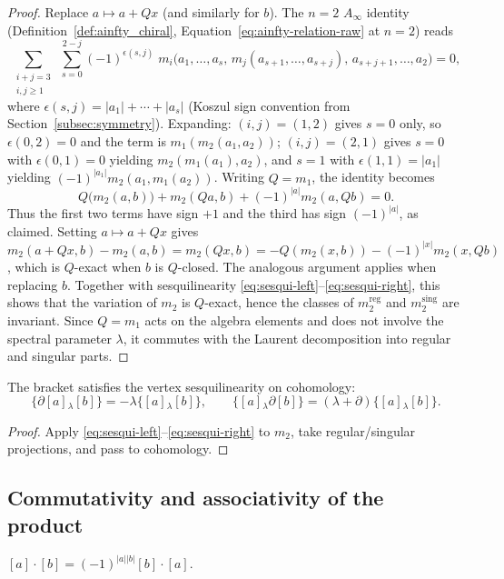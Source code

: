 \begin{proof}
Replace $a\mapsto a+Qx$ (and similarly for $b$). The $n=2$ $A_\infty$ identity (Definition~\ref{def:ainfty_chiral}, Equation~\eqref{eq:ainfty-relation-raw} at $n=2$) reads
\[
 \sum_{\substack{i+j=3 \\ i,j\ge 1}}\;\sum_{s=0}^{2-j}
 (-1)^{\epsilon(s,j)}\;
 m_i\bigl(a_1,\dots,a_s,\,m_j(a_{s+1},\dots,a_{s+j}),\,a_{s+j+1},\dots,a_2\bigr) = 0,
\]
where $\epsilon(s,j) = |a_1|+\cdots+|a_s|$ (Koszul sign convention from Section~\ref{subsec:symmetry}).
Expanding: $(i,j)=(1,2)$ gives $s=0$ only, so $\epsilon(0,2)=0$ and the term is $m_1(m_2(a_1,a_2))$; $(i,j)=(2,1)$ gives $s=0$ with $\epsilon(0,1)=0$ yielding $m_2(m_1(a_1),a_2)$, and $s=1$ with $\epsilon(1,1)=|a_1|$ yielding $(-1)^{|a_1|}m_2(a_1,m_1(a_2))$. Writing $Q=m_1$, the identity becomes
\[
 Q\bigl(m_2(a,b)\bigr) + m_2(Qa,b) + (-1)^{|a|}m_2(a,Qb) = 0.
\]
Thus the first two terms have sign $+1$ and the third has sign $(-1)^{|a|}$, as claimed. Setting $a\mapsto a+Qx$ gives $m_2(a+Qx,b) - m_2(a,b) = m_2(Qx,b) = -Q(m_2(x,b)) - (-1)^{|x|}m_2(x,Qb)$, which is $Q$-exact when $b$ is $Q$-closed. The analogous argument applies when replacing $b$. Together with sesquilinearity \eqref{eq:sesqui-left}--\eqref{eq:sesqui-right}, this shows that the variation of $m_2$ is $Q$-exact, hence the classes of $m_2^{\mathrm{reg}}$ and $m_2^{\mathrm{sing}}$ are invariant. Since $Q = m_1$ acts on the algebra elements and does not involve the spectral parameter $\lambda$, it commutes with the Laurent decomposition into regular and singular parts.
\end{proof}

\begin{proposition}[Sesquilinearity on $H$]
\label{prop:sesqui-H}
The bracket satisfies the vertex sesquilinearity on cohomology:
\[
\{\partial[a]{}_\lambda [b]\} = -\lambda \{[a]{}_\lambda [b]\},\qquad
\{[a]{}_\lambda \partial[b]\} = (\lambda+\partial)\{[a]{}_\lambda [b]\}.
\]
\end{proposition}

\begin{proof}
Apply \eqref{eq:sesqui-left}–\eqref{eq:sesqui-right} to $m_2$, take regular/singular projections, and pass to cohomology.
\end{proof}

\subsection{Commutativity and associativity of the product}
\label{subsec:comm-assoc}
\begin{lemma}
\label{lem:commutative}
$[a]\cdot[b] = (-1)^{|a||b|}[b]\cdot[a]$.
\end{lemma}

